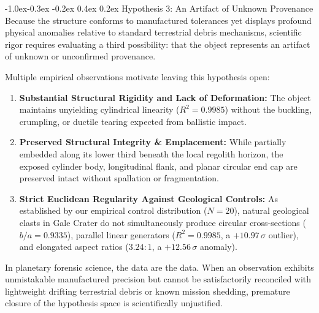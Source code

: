 \documentclass[11pt,a4paper]{article}
\makeatletter
\renewcommand\subsection{\@startsection{subsection}{2}{\z@}%
                                     {-1.0ex\@plus -0.3ex \@minus -0.2ex}%
                                     {0.4ex \@plus 0.2ex}%
                                     {\normalfont\normalsize\bfseries}}
\makeatother
\begin{document}
\subsection{Hypothesis 3: An Artifact of Unknown Provenance}
Because the structure conforms to manufactured tolerances yet displays profound physical anomalies relative to standard terrestrial debris mechanisms, scientific rigor requires evaluating a third possibility: that the object represents an artifact of unknown or unconfirmed provenance.

Multiple empirical observations motivate leaving this hypothesis open:
\begin{enumerate}
	\item \textbf{Substantial Structural Rigidity and Lack of Deformation:} The object maintains unyielding cylindrical linearity ($R^2 = 0.9985$) without the buckling, crumpling, or ductile tearing expected from ballistic impact.
	\item \textbf{Preserved Structural Integrity \& Emplacement:} While partially embedded along its lower third beneath the local regolith horizon, the exposed cylinder body, longitudinal flank, and planar circular end cap are preserved intact without spallation or fragmentation.
	\item \textbf{Strict Euclidean Regularity Against Geological Controls:} As established by our empirical control distribution ($N = 20$), natural geological clasts in Gale Crater do not simultaneously produce circular cross-sections ($b/a = 0.9335$), parallel linear generators ($R^2 = 0.9985$, a $+10.97\,\sigma$ outlier), and elongated aspect ratios ($3.24:1$, a $+12.56\,\sigma$ anomaly).
\end{enumerate}

In planetary forensic science, the data are the data. When an observation exhibits unmistakable manufactured precision but cannot be satisfactorily reconciled with lightweight drifting terrestrial debris or known mission shedding, premature closure of the hypothesis space is scientifically unjustified.
\end{document}
